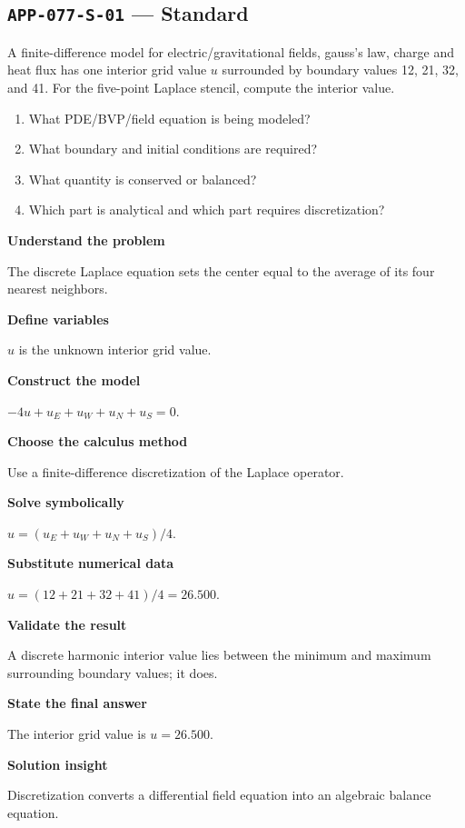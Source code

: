 \documentclass[11pt]{book}
\newcommand{\pid}[1]{\texttt{#1}}
\begin{document}
\subsection*{\pid{APP-077-S-01} — Standard}
\begin{problembox}
A finite-difference model for electric/gravitational fields, gauss's law, charge and heat flux has one interior grid value $u$ surrounded by boundary values 12, 21, 32, and 41. For the five-point Laplace stencil, compute the interior value.
\end{problembox}
\begin{promptbox}\begin{enumerate}
\item What PDE/BVP/field equation is being modeled?
\item What boundary and initial conditions are required?
\item What quantity is conserved or balanced?
\item Which part is analytical and which part requires discretization?
\end{enumerate}\end{promptbox}
\begin{solutionbox}
\textbf{Understand the problem}\par The discrete Laplace equation sets the center equal to the average of its four nearest neighbors.\par\medskip
\textbf{Define variables}\par $u$ is the unknown interior grid value.\par\medskip
\textbf{Construct the model}\par $-4u+u_E+u_W+u_N+u_S=0$.\par\medskip
\textbf{Choose the calculus method}\par Use a finite-difference discretization of the Laplace operator.\par\medskip
\textbf{Solve symbolically}\par $u=(u_E+u_W+u_N+u_S)/4$.\par\medskip
\textbf{Substitute numerical data}\par $u=(12+21+32+41)/4=26.500$.\par\medskip
\textbf{Validate the result}\par A discrete harmonic interior value lies between the minimum and maximum surrounding boundary values; it does.\par\medskip
\textbf{State the final answer}\par The interior grid value is $u=26.500$.\par\medskip
\textbf{Solution insight}\par Discretization converts a differential field equation into an algebraic balance equation.\par\medskip
\end{solutionbox}
\end{document}
